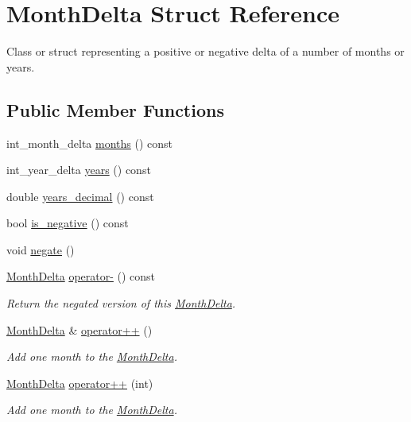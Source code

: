 \hypertarget{structMonthDelta}{\section{\-Month\-Delta \-Struct \-Reference}
\label{structMonthDelta}
}


\-Class or struct representing a positive or negative delta of a number of months or years.  


\subsection*{\-Public \-Member \-Functions}
\begin{DoxyCompactItemize}
\item 
int\-\_\-month\-\_\-delta \hyperlink{structMonthDelta_a47f7592328f434f4091a5b044d83976a}{months} () const 
\item 
int\-\_\-year\-\_\-delta \hyperlink{structMonthDelta_abd1a36332a0347d39a9a7b7befceb6f5}{years} () const 
\item 
double \hyperlink{structMonthDelta_ae7ac38d813d15ea4b9db82a43ed1be89}{years\-\_\-decimal} () const 
\item 
bool \hyperlink{structMonthDelta_a4f0b4051d92cd180ac5f9f7466a36f57}{is\-\_\-negative} () const 
\item 
void \hyperlink{structMonthDelta_a88f17c6793e3e48ac00a70e12b9045d3}{negate} ()
\item 
\hyperlink{structMonthDelta}{\-Month\-Delta} \hyperlink{structMonthDelta_a5d754349cccfb68c729461b7a96d666f}{operator-\/} () const 
\begin{DoxyCompactList}\small\item\em \-Return the negated version of this \hyperlink{structMonthDelta}{\-Month\-Delta}. \end{DoxyCompactList}\item 
\hyperlink{structMonthDelta}{\-Month\-Delta} \& \hyperlink{structMonthDelta_a2d925db7f08eb18d1dcd4961d8149b48}{operator++} ()
\begin{DoxyCompactList}\small\item\em \-Add one month to the \hyperlink{structMonthDelta}{\-Month\-Delta}. \end{DoxyCompactList}\item 
\hyperlink{structMonthDelta}{\-Month\-Delta} \hyperlink{structMonthDelta_afcbef7f90cde7cf06a312da4acd5a1b9}{operator++} (int)
\begin{DoxyCompactList}\small\item\em \-Add one month to the \hyperlink{structMonthDelta}{\-Month\-Delta}. \end{DoxyCompactList}\item 

\end{DoxyCompactItemize}
